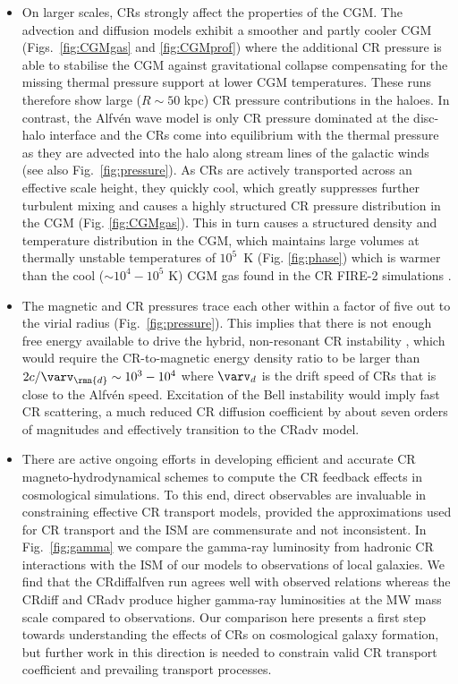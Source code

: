 \documentclass[useAMS,usenatbib]{mnras}
\begin{document}
\begin{itemize}
\item On larger scales, CRs strongly affect the properties of the CGM. The advection and diffusion models exhibit a smoother and partly cooler CGM (Figs.\ \ref{fig:CGMgas} and \ref{fig:CGMprof}) where the additional CR pressure is able to stabilise the CGM against gravitational collapse compensating for the missing thermal pressure support at lower CGM temperatures. These runs therefore show large ($R\sim50$ kpc) CR pressure contributions in the haloes. In contrast, the Alfv\'en wave model is only CR pressure dominated at the disc-halo interface and the CRs come into equilibrium with the thermal pressure as they are advected into the halo along stream lines of the galactic winds (see also Fig.\ \ref{fig:pressure}). As CRs are actively transported across an effective scale height, they quickly cool, which greatly suppresses further turbulent mixing and causes a highly structured CR pressure distribution in the CGM (Fig. \ref{fig:CGMgas}). This in turn causes a structured density and temperature distribution in the CGM, which maintains large volumes at thermally unstable temperatures of $10^5$~K (Fig. \ref{fig:phase}) which is warmer than the cool ($\sim10^4-10^5$ K) CGM gas found in the CR FIRE-2 simulations \citep[see Fig. 7 in][]{Ji2019}.

\item The magnetic and CR pressures trace each other within a factor of five out to the virial radius (Fig.~\ref{fig:pressure}). This implies that there is not enough free energy available to drive the hybrid, non-resonant CR instability \citep{Bell2004}, which would require the CR-to-magnetic energy density ratio to be larger than $2c/\varv_\rmn{d}\sim10^3-10^4$ where $\varv_d$ is the drift speed of CRs that is close to the Alfv\'en speed. Excitation of the Bell instability would imply fast CR scattering, a much reduced CR diffusion coefficient by about seven orders of magnitudes and effectively transition to the CRadv model.

\item There are active ongoing efforts in developing efficient and accurate CR magneto-hydrodynamical schemes \citep{Jiang2018,Thomas2019} to compute the CR feedback effects in cosmological simulations. To this end, direct observables are invaluable in constraining effective CR transport models, provided the approximations used for CR transport and the ISM are commensurate and not inconsistent. In Fig.\ \ref{fig:gamma} we compare the gamma-ray luminosity from hadronic CR interactions with the ISM of our models to observations of local galaxies. We find that the CRdiffalfven run agrees well with observed relations whereas the CRdiff and CRadv produce higher gamma-ray luminosities at the MW mass scale compared to observations. Our comparison here presents a first step towards understanding the effects of CRs on cosmological galaxy formation, but further work in this direction is needed to constrain valid CR transport coefficient and prevailing transport processes.
\end{itemize}
\end{document}
